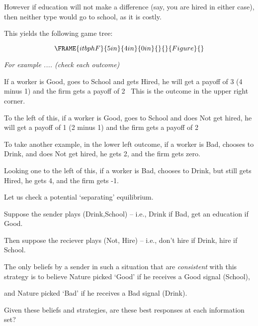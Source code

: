 \documentclass{article}
\begin{document}
However if education will not make a difference (say, you are hired in
either case), then neither type would go to school, as it is costly.

This yields the following game tree:

\begin{equation}
\FRAME{itbphF}{5in}{4in}{0in}{}{}{Figure}{\special{language "Scientific
Word";type "GRAPHIC";maintain-aspect-ratio TRUE;display "USEDEF";valid_file
"T";width 5in;height 4in;depth 0in;original-width 7.8006in;original-height
5.7164in;cropleft "0";croptop "1";cropright "1";cropbottom "0";tempfilename
'JSH1WT0E.wmf';tempfile-properties "XPR";}}
\end{equation}

\textit{For example .... (check each outcome)}

If a worker is Good, goes to School and gets Hired, he will get a payoff of
3 (4 minus 1) and the firm gets a payoff of 2 \ This is the outcome in the
upper right corner.

\bigskip

To the left of this, if a worker is Good, goes to School and does Not get
hired, he will get a payoff of 1 (2 minus 1) and the firm gets a payoff of 2
\ 

\bigskip

To take another example, in the lower left outcome, if a worker is Bad,
chooses to Drink, and does Not get hired, he gets 2, and the firm gets zero.
\ 

Looking one to the left of this, if a worker is Bad, chooses to Drink, but
still gets Hired, he gets 4, and the firm gets -1. \ 

\bigskip

Let us check a potential `separating' equilibrium.

Suppose the sender plays (Drink,School) -- i.e., Drink if Bad, get an
education if Good.

Then suppose the reciever plays (Not, Hire) -- i.e., don't hire if Drink,
hire if School.

\bigskip

The only beliefs by a sender in such a situation that are \textit{consistent}
with this strategy is to believe Nature picked `Good' if he receives a Good
signal (School),

and Nature picked `Bad' if he receives a Bad signal (Drink). \ 

\bigskip

Given these beliefs and strategies, are these best responses at each
information set?
\end{document}
